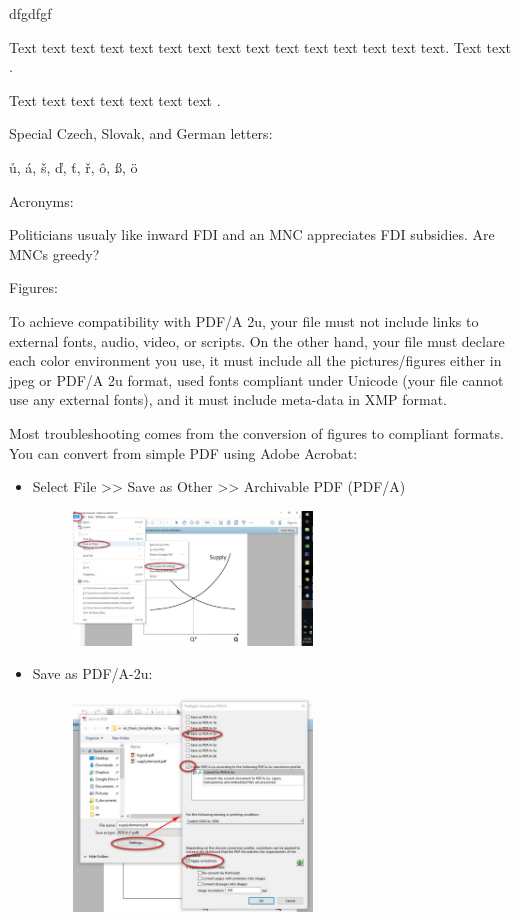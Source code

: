 dfgdfgf

\label{sec:citace}

Text text text text text text text text text text text text text text text. Text text  \citet{Haufler2006}.

Text text text text text text text \cite[see, ,][pg.~10]{Haaparanta1996}. 

Special Czech, Slovak, and German letters:

\r{u}, \'{a}, \v{s}, \v{d}, \v{t}, \v{r}, \^{o}, \ss{}, \"{o}

Acronyms:

Politicians usualy like inward \ac{FDI} and an \ac{MNC} appreciates \ac{FDI} subsidies. Are \acp{MNC} greedy?

Figures:

To achieve compatibility with PDF/A 2u, your file must not include links to external fonts, audio, video, or scripts. On the other hand, your file must declare each color environment you use, it must include all the pictures/figures either in jpeg or PDF/A 2u format, used fonts compliant under Unicode (your file cannot use any external fonts), and it must include meta-data in XMP format.


Most troubleshooting comes from the conversion of figures to compliant formats. You can convert from simple PDF using Adobe Acrobat:
\begin{itemize}
	\item Select File >> Save as Other >> Archivable PDF (PDF/A)
				\begin{figure}[!h]
					\centering
						\includegraphics[width=0.6\textwidth]{Figures/conversion1.pdf}
					\label{fig:conversion1}
				\end{figure}
	\item Save as PDF/A-2u:
			\begin{figure}[!h]
				\centering
					\includegraphics[width=0.6\textwidth]{Figures/conversion2.pdf}
				\label{fig:conversion2}
			\end{figure}
\end{itemize}	


